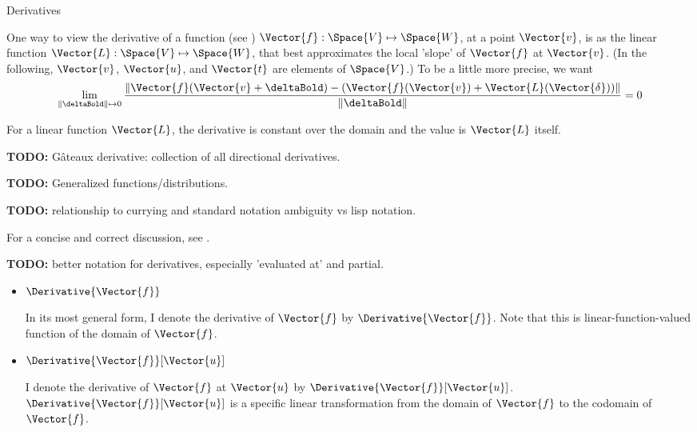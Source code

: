\begin{plSection}{Derivatives}
\label{sec:Derivatives}

One way to view the derivative of a 
function (see )
$\Vector{f} : \Space{V} \mapsto \Space{W}$,
at a point $\Vector{v}$,
is as the linear function $\Vector{L}:\Space{V} \mapsto \Space{W}$,
that best approximates the local 'slope' of $\Vector{f}$ at $\Vector{v}$.
(In the following, $\Vector{v}$, $\Vector{u}$, and $\Vector{t}$ are elements of $\Space{V}$.)
To be a little more precise, we want
\begin{equation}
\lim_{ \|\deltaBold  \| \mapsto 0}
\frac{ \| \Vector{f}(\Vector{v} + \deltaBold) - (\Vector{f}(\Vector{v}) + \Vector{L}(\Vector{\delta})) \|}
{\|\deltaBold  \| }
 = 0
\end{equation}

\begin{plNote}{}{}
For a linear function $\Vector{L}$,
the derivative is constant over the domain
and the value is $\Vector{L}$ itself.
\end{plNote}

\textbf{TODO:} G\^{a}teaux derivative: collection of all
directional derivatives.

\textbf{TODO:} Generalized functions/distributions.

\textbf{TODO:}
relationship to currying and standard notation ambiguity vs
lisp notation.

For a concise and correct discussion, 
see .

\textbf{TODO:} better notation for derivatives, especially 
'evaluated at' and partial.

\begin{itemize}

\item $\Derivative{\Vector{f}}$

In its most general form,
I denote the derivative of $\Vector{f}$ by $\Derivative{\Vector{f}}$.
Note that this is linear-function-valued function 
of the domain of $\Vector{f}$.

\item $\Derivative{\Vector{f}}[\Vector{u}]$

I denote the derivative of $\Vector{f}$ at $\Vector{u}$ by 
$\Derivative{\Vector{f}}[\Vector{u}]$.
$\Derivative{\Vector{f}}[\Vector{u}]$ 
is a specific linear transformation from
the domain of $\Vector{f}$ to the codomain of $\Vector{f}$.


\end{itemize}
\end{plSection}
